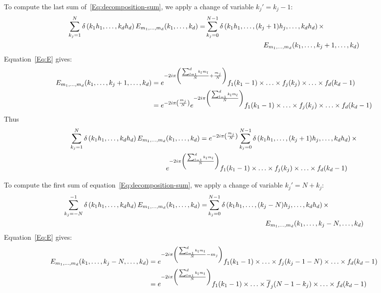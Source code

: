 To compute the last sum of~\eqref{Eq:decomposition-sum}, we apply a change of variable $k_j'=k_j-1$:
\begin{align}
\sum_{k_j=1}^{N}\delta\left(k_1h_1,\hdots,k_dh_d\right) E_{m_1,\hdots,m_d}(k_1,\hdots,k_d)
 = & \sum_{k_j=0}^{N-1}\delta\left(k_1h_1,\hdots,(k_j+1)h_j,\hdots,k_dh_d\right) \times\notag\\
   & \hspace*{3cm} E_{m_1,\hdots,m_d}(k_1,\hdots,k_j+1,\hdots,k_d)
\end{align}
Equation~\eqref{Eq:E} gives:
\begin{align}
E_{m_1,\hdots,m_d}(k_1,\hdots,k_j+1,\hdots,k_d) 
 &= 
     e^{-2i\pi\left(\frac{\sum_{l=1}^{d}k_l m_l}{N} +\frac{m_j}{N}\right)}
     f_1(k_1-1)\times\hdots\times f_j(k_j)\times\hdots\times f_d(k_d-1)\notag\\
 &= 
     e^{-2i\pi\left(\frac{m_j}{N}\right)}
     e^{-2i\pi\left(\frac{\sum_{l=1}^{d}k_l m_l}{N}\right)}
     f_1(k_1-1)\times\hdots\times f_j(k_j)\times\hdots\times f_d(k_d-1)
\end{align}
Thus
\begin{align}
\sum_{k_j=1}^{N}\delta\left(k_1h_1,\hdots,k_dh_d\right) E_{m_1,\hdots,m_d}&(k_1,\hdots,k_d)
  = e^{-2i\pi\left(\frac{m_j}{N}\right)} \sum_{k_j=0}^{N-1}\delta\left(k_1h_1,\hdots,(k_j+1)h_j,\hdots,k_dh_d\right) \times\notag\\
  & e^{-2i\pi\left(\frac{\sum_{l=1}^{d}k_l m_l}{N}\right)}
     f_1(k_1-1)\times\hdots\times f_j(k_j)\times\hdots\times f_d(k_d-1) \label{Eq:j-sigma+}
\end{align}

To compute the first sum of equation~\eqref{Eq:decomposition-sum}, we apply a change of variable $k_j'=N+k_j$:
\begin{align}
\sum_{k_j=-N}^{-1}\delta\left(k_1h_1,\hdots,k_dh_d\right) E_{m_1,\hdots,m_d}(k_1,\hdots,k_d)
 = & \sum_{k_j=0}^{N-1}\delta\left(k_1h_1,\hdots,(k_j-N)h_j,\hdots,k_dh_d\right) \times\notag\\
   & \hspace*{3cm} E_{m_1,\hdots,m_d}(k_1,\hdots,k_j-N,\hdots,k_d)
\end{align}
Equation~\eqref{Eq:E} gives:
\begin{align}
E_{m_1,\hdots,m_d}(k_1,\hdots,k_j-N,\hdots,k_d) 
 &= 
     e^{-2i\pi\left(\frac{\sum_{l=1}^{d}k_l m_l}{N} -m_j\right)}
     f_1(k_1-1)\times\hdots\times f_j(k_j-1-N)\times\hdots\times f_d(k_d-1) \notag\\
 &= 
     e^{-2i\pi\left(\frac{\sum_{l=1}^{d}k_l m_l}{N}\right)}
     f_1(k_1-1)\times\hdots\times \overline{f}_j(N-1-k_j)\times\hdots\times f_d(k_d-1) 
\end{align}

